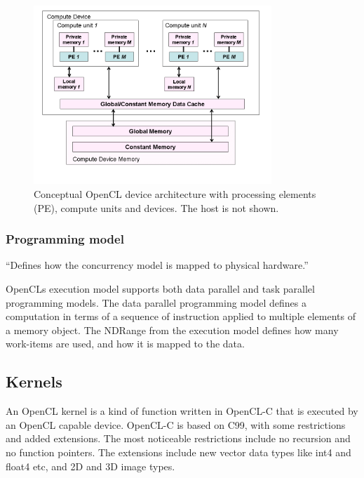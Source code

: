 \begin{figure}[h]
  \centering
  \includegraphics[width=0.8\textwidth]{images/memory-model.png}
  \caption{Conceptual OpenCL device architecture with processing
    elements (PE), compute units and devices. The host is not shown.}
  \label{execution-model-figure}
\end{figure}



\subsubsection{Programming model}

``Defines how the concurrency model is mapped to physical hardware.''

OpenCLs execution model supports both data parallel and task parallel
programming models. The data parallel programming model defines a
computation in terms of a sequence of instruction applied to multiple
elements of a memory object. The NDRange from the execution model
defines how many work-items are used, and how it is mapped to the
data.


\subsection{Kernels}

An OpenCL kernel is a kind of function written in OpenCL-C that is
executed by an OpenCL capable device. OpenCL-C is based on C99, with
some restrictions and added extensions. The most noticeable
restrictions include no recursion and no function pointers. The
extensions include new vector data types like int4 and float4 etc, and
2D and 3D image types.



